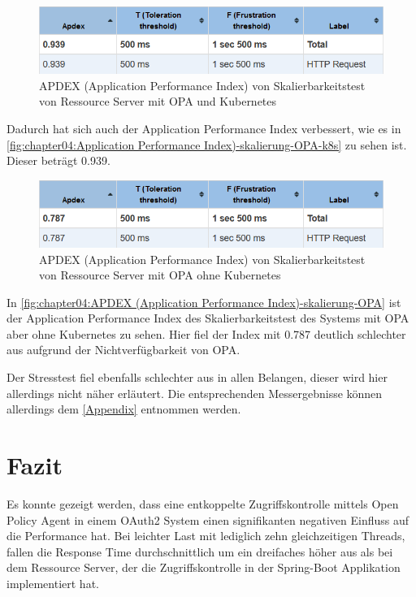 \begin{figure}[H]
  \centering
  \includegraphics[width=1.0\textwidth]{gfx/APDEX (Application Performance Index)-skalierung-OPA-k8s.png}
  \caption{APDEX (Application Performance Index) von Skalierbarkeitstest von Ressource Server mit OPA und Kubernetes}
  \label{fig:chapter04:Application Performance Index)-skalierung-OPA-k8s}
\end{figure}

Dadurch hat sich auch der Application Performance Index verbessert, wie es in \autoref{fig:chapter04:Application Performance Index)-skalierung-OPA-k8s} zu sehen ist. Dieser beträgt 0.939. 

\begin{figure}[H]
  \centering
  \includegraphics[width=1.0\textwidth]{gfx/APDEX (Application Performance Index)-skalierung-OPA.png}
  \caption{APDEX (Application Performance Index) von Skalierbarkeitstest von Ressource Server mit OPA ohne Kubernetes}
  \label{fig:chapter04:APDEX (Application Performance Index)-skalierung-OPA}
\end{figure}

In \autoref{fig:chapter04:APDEX (Application Performance Index)-skalierung-OPA} ist der Application Performance Index des Skalierbarkeitstest des Systems mit OPA aber ohne Kubernetes zu sehen. Hier fiel der Index mit 0.787 deutlich schlechter aus aufgrund der Nichtverfügbarkeit von OPA.\smallskip

Der Stresstest fiel ebenfalls schlechter aus in allen Belangen, dieser wird hier allerdings nicht näher erläutert. Die entsprechenden Messergebnisse können allerdings dem \autoref{Appendix} entnommen werden. 

\section{Fazit}
Es konnte gezeigt werden, dass eine entkoppelte Zugriffskontrolle mittels Open Policy Agent in einem OAuth2 System einen signifikanten negativen Einfluss auf die Performance hat. Bei leichter Last mit lediglich zehn gleichzeitigen Threads, fallen die Response Time durchschnittlich um ein dreifaches höher aus als bei dem Ressource Server, der die Zugriffskontrolle in der Spring-Boot Applikation implementiert hat.\smallskip

